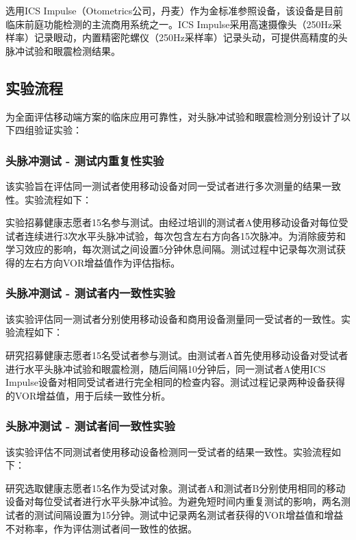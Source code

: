 选用ICS Impulse（Otometrics公司，丹麦）作为金标准参照设备，该设备是目前临床前庭功能检测的主流商用系统之一。ICS Impulse采用高速摄像头（250Hz采样率）记录眼动，内置精密陀螺仪（250Hz采样率）记录头动，可提供高精度的头脉冲试验和眼震检测结果。

\subsection{实验流程}

为全面评估移动端方案的临床应用可靠性，对头脉冲试验和眼震检测分别设计了以下四组验证实验：

\subsubsection{头脉冲测试 - 测试内重复性实验}

该实验旨在评估同一测试者使用移动设备对同一受试者进行多次测量的结果一致性。实验流程如下：

实验招募健康志愿者15名参与测试。由经过培训的测试者A使用移动设备对每位受试者连续进行3次水平头脉冲试验，每次包含左右方向各15次脉冲。为消除疲劳和学习效应的影响，每次测试之间设置5分钟休息间隔。测试过程中记录每次测试获得的左右方向VOR增益值作为评估指标。

\subsubsection{头脉冲测试 - 测试者内一致性实验}

该实验评估同一测试者分别使用移动设备和商用设备测量同一受试者的一致性。实验流程如下：

研究招募健康志愿者15名受试者参与测试。由测试者A首先使用移动设备对受试者进行水平头脉冲试验和眼震检测，随后间隔10分钟后，同一测试者A使用ICS Impulse设备对相同受试者进行完全相同的检查内容。测试过程记录两种设备获得的VOR增益值，用于后续一致性分析。

\subsubsection{头脉冲测试 - 测试者间一致性实验}

该实验评估不同测试者使用移动设备检测同一受试者的结果一致性。实验流程如下：

研究选取健康志愿者15名作为受试对象。测试者A和测试者B分别使用相同的移动设备对每位受试者进行水平头脉冲试验。为避免短时间内重复测试的影响，两名测试者的测试间隔设置为15分钟。测试中记录两名测试者获得的VOR增益值和增益不对称率，作为评估测试者间一致性的依据。

